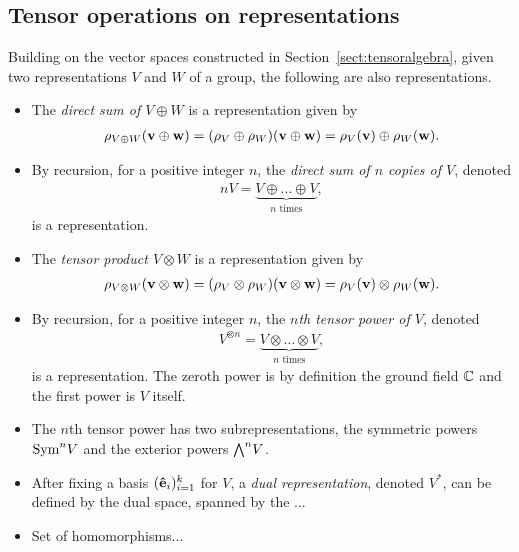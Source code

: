 \subsection{Tensor operations on representations}\label{sect:tensorrepr}

Building on the vector spaces constructed in Section~\ref{sect:tensoralgebra}, given two representations $V$ and $W$ of a group, the following are also representations.

\begin{itemize}
	\item The \emph{direct sum of $V \oplus W$} is a representation given by 
	\begin{align*}
		\rho_{V \oplus W}(\mathbf{v} \oplus \mathbf{w}) = (\rho_V \oplus \rho_W)(\mathbf{v} \oplus \mathbf{w}) = \rho_V(\mathbf{v}) \oplus \rho_W(\mathbf{w}).
	\end{align*}
	
	\item By recursion, for a positive integer $n$, the \emph{direct sum of $n$ copies of $V$}, denoted
	\begin{align*}
		nV = \underset{\text{$n$ times}}{\underbrace{V \oplus \dots \oplus V}},
	\end{align*}
	is a representation.
	
	\item The \emph{tensor product $V \otimes W$} is a representation given by
	\begin{align*}
		\rho_{V \otimes W}(\mathbf{v} \otimes \mathbf{w}) = (\rho_V \otimes \rho_W)(\mathbf{v} \otimes \mathbf{w}) = \rho_V(\mathbf{v}) \otimes \rho_W(\mathbf{w}).
	\end{align*}
	
	\item By recursion, for a positive integer $n$, the \emph{$n$th tensor power of $V$}, denoted
	\begin{align*}
		V^{\otimes n} = \underset{\text{$n$ times}}{\underbrace{V \otimes \dots \otimes V}},
	\end{align*}
	is a representation. The zeroth power is by definition the ground field $\mathbb{C}$ and the first power is $V$ itself.
	
	\item The $n$th tensor power has two subrepresentations, the symmetric powers $\text{Sym}^n V$ and the exterior powers ${\bigwedge}^n V$. 
	
	\item After fixing a basis $(\mathbf{\hat{e}}_i)_{i=1}^k$ for $V$, a \emph{dual representation}, denoted $V^*$, can be defined by the dual space, spanned by the ...
	
	\item Set of homomorphisms...
\end{itemize}